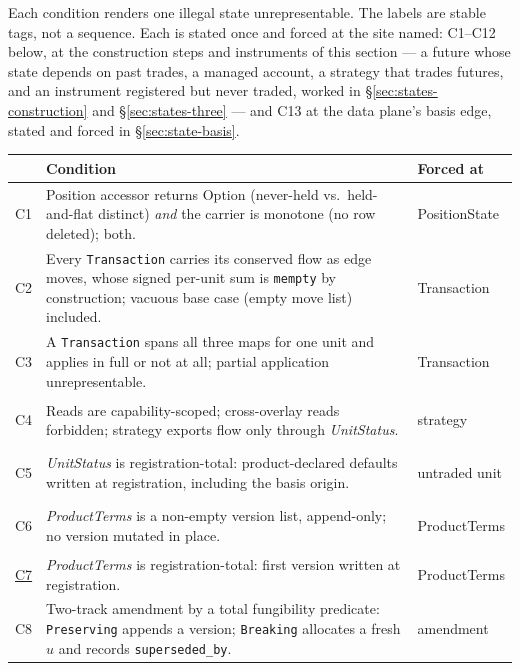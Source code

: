 \documentclass[11pt,a4paper]{article}
\begin{document}
Each condition renders one illegal state unrepresentable. The labels are stable tags, not
a sequence. Each is stated once and forced at the site named: C1--C12 below, at the
construction steps and instruments of this section --- a future whose state depends on past
trades, a managed account, a strategy that trades futures, and an instrument registered but
never traded, worked in \S\ref{sec:states-construction} and \S\ref{sec:states-three} ---
and C13 at the data plane's basis edge, stated and forced in \S\ref{sec:state-basis}.

\begin{longtable}{@{}p{0.8cm} p{11.0cm} p{2.5cm}@{}}
\toprule
 & \textbf{Condition} & \textbf{Forced at} \\
\midrule
\endhead
\hypertarget{cond:C1}{C1}\label{cond:C1} & Position accessor returns $\mathrm{Option}$
(never-held vs.\ held-and-flat distinct) \emph{and} the carrier is monotone (no row
deleted); both. & PositionState \\
\addlinespace
\hypertarget{cond:C2}{C2}\label{cond:C2} & Every \texttt{Transaction} carries its conserved
flow as edge moves, whose signed per-unit sum is \texttt{mempty} by construction; vacuous
base case (empty move list) included. & Transaction \\
\addlinespace
\hypertarget{cond:C3}{C3}\label{cond:C3} & A \texttt{Transaction} spans all three maps for
one unit and applies in full or not at all; partial application unrepresentable. &
Transaction \\
\addlinespace
\hypertarget{cond:C4}{C4}\label{cond:C4} & Reads are capability-scoped; cross-overlay reads
forbidden; strategy exports flow only through \emph{UnitStatus}. & strategy \\
\addlinespace
\hypertarget{cond:C5}{C5}\label{cond:C5} & \emph{UnitStatus} is registration-total:
product-declared defaults written at registration, including the basis origin. &
untraded unit \\
\addlinespace
\hypertarget{cond:C6}{C6}\label{cond:C6} & \emph{ProductTerms} is a non-empty version list,
append-only; no version mutated in place. & ProductTerms \\
\addlinespace
\hyperref[cond:C7]{C7} & \emph{ProductTerms} is registration-total: first
version written at registration. & ProductTerms \\
\addlinespace
\hypertarget{cond:C8}{C8}\label{cond:C8} & Two-track amendment by a total fungibility
predicate: \texttt{Preserving} appends a version; \texttt{Breaking} allocates a fresh $u$
and records \texttt{superseded\_by}. & amendment \\

\end{longtable}
\end{document}
